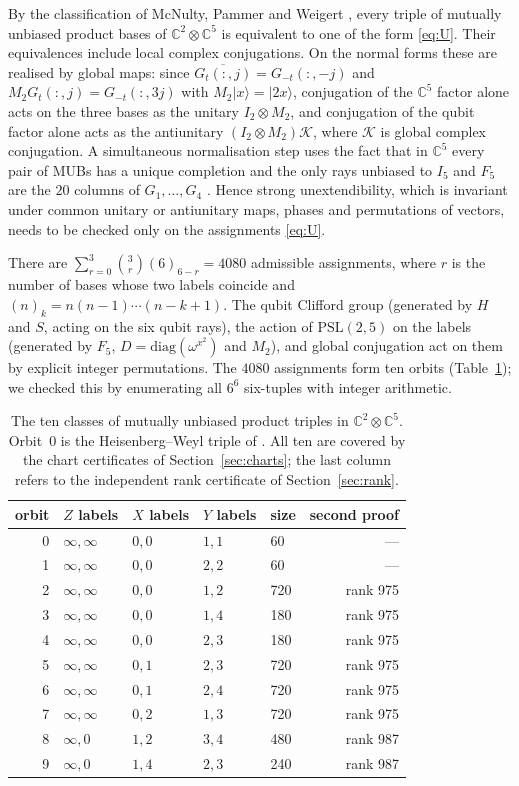 \documentclass[11pt]{article}
\theoremstyle{definition}
\theoremstyle{remark}
\newcommand{\C}{\mathbb{C}}
\begin{document}
By the classification of McNulty, Pammer and Weigert \cite[Cor.~3]{MPW2016}, every triple of mutually unbiased product
bases of $\C^2\otimes\C^5$ is equivalent to one of the form \eqref{eq:U}. Their equivalences include local complex
conjugations. On the normal forms these are realised by global maps: since $\overline{G_t(:,j)}=G_{-t}(:,-j)$ and
$M_2G_t(:,j)=G_{-t}(:,3j)$ with $M_2|x\rangle=|2x\rangle$, conjugation of the $\C^5$ factor alone acts on the three
bases as the unitary $I_2\otimes M_2$, and conjugation of the qubit factor alone acts as the antiunitary
$(I_2\otimes M_2)\mathcal K$, where $\mathcal K$ is global complex conjugation. A simultaneous normalisation step uses the
fact that in $\C^5$ every pair of MUBs has a unique completion and the only rays unbiased to $I_5$ and $F_5$ are the
$20$ columns of $G_1,\dots,G_4$ \cite[Sec.~4.1]{BWB2010}. Hence strong unextendibility, which is invariant under common
unitary or antiunitary maps, phases and permutations of vectors, needs to be checked only on the assignments
\eqref{eq:U}.

There are $\sum_{r=0}^3\binom3r(6)_{6-r}=4080$ admissible assignments, where $r$ is the number of bases whose two
labels coincide and $(n)_k=n(n-1)\cdots(n-k+1)$. The qubit Clifford group (generated by $H$ and
$S$, acting on the six qubit rays), the action of $\mathrm{PSL}(2,5)$ on the labels (generated by $F_5$, $D=\mathrm{diag}
(\omega^{x^2})$ and $M_2$), and global conjugation act on them by explicit integer permutations. The $4080$ assignments
form ten orbits (Table~\ref{tab:orbits}); we checked this by enumerating all $6^6$ six-tuples with integer arithmetic.

\begin{table}[ht]
\centering
\begin{tabular}{rllllr}
\toprule
orbit & $Z$ labels & $X$ labels & $Y$ labels & size & second proof\\
\midrule
0 & $\infty,\infty$ & $0,0$ & $1,1$ & 60 & --- \\
1 & $\infty,\infty$ & $0,0$ & $2,2$ & 60 & --- \\
2 & $\infty,\infty$ & $0,0$ & $1,2$ & 720 & rank 975\\
3 & $\infty,\infty$ & $0,0$ & $1,4$ & 180 & rank 975\\
4 & $\infty,\infty$ & $0,0$ & $2,3$ & 180 & rank 975\\
5 & $\infty,\infty$ & $0,1$ & $2,3$ & 720 & rank 975\\
6 & $\infty,\infty$ & $0,1$ & $2,4$ & 720 & rank 975\\
7 & $\infty,\infty$ & $0,2$ & $1,3$ & 720 & rank 975\\
8 & $\infty,0$ & $1,2$ & $3,4$ & 480 & rank 987\\
9 & $\infty,0$ & $1,4$ & $2,3$ & 240 & rank 987\\
\bottomrule
\end{tabular}
\caption{The ten classes of mutually unbiased product triples in $\C^2\otimes\C^5$. Orbit~$0$ is the Heisenberg--Weyl
triple of \cite{GMMP2017}. All ten are covered by the chart certificates of Section~\ref{sec:charts}; the last column
refers to the independent rank certificate of Section~\ref{sec:rank}.}
\label{tab:orbits}
\end{table}
\end{document}
